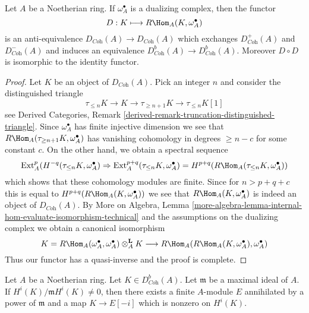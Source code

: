 \begin{lemma}
\label{lemma-dualizing}
Let $A$ be a Noetherian ring. If $\omega_A^\bullet$ is a dualizing
complex, then the functor
$$
D : K \longmapsto R\Hom_A(K, \omega_A^\bullet)
$$
is an anti-equivalence $D_{\textit{Coh}}(A) \to D_{\textit{Coh}}(A)$
which exchanges $D^+_{\textit{Coh}}(A)$ and $D^-_{\textit{Coh}}(A)$
and induces an equivalence $D^b_{\textit{Coh}}(A) \to D^b_{\textit{Coh}}(A)$.
Moreover $D \circ D$ is isomorphic to the identity functor.
\end{lemma}

\begin{proof}
Let $K$ be an object of $D_{\textit{Coh}}(A)$. Pick an integer $n$ and
consider the distinguished triangle
$$
\tau_{\leq n}K \to K \to \tau_{\geq n + 1}K \to \tau_{\leq n}K[1]
$$
see Derived Categories, Remark
\ref{derived-remark-truncation-distinguished-triangle}.
Since $\omega_A^\bullet$ has finite injective dimension we see
that $R\Hom_A(\tau_{\geq n + 1}K, \omega_A^\bullet)$ has vanishing
cohomology in degrees $\geq n - c$ for some constant $c$.
On the other hand, we obtain a spectral sequence
$$
\text{Ext}_A^p(H^{-q}(\tau_{\leq n}K, \omega_A^\bullet)
\Rightarrow
\text{Ext}_A^{p + q}(\tau_{\leq n}K, \omega_A^\bullet) =
H^{p + q}(R\Hom_A(\tau_{\leq n}K, \omega_A^\bullet))
$$
which shows that these cohomology modules are finite. Since for
$n > p + q + c$ this is equal to $H^{p + q}(R\Hom_A(K, \omega_A^\bullet))$
we see that $R\Hom_A(K, \omega_A^\bullet)$ is indeed an object
of $D_{\textit{Coh}}(A)$.
By More on Algebra, Lemma
\ref{more-algebra-lemma-internal-hom-evaluate-isomorphism-technical}
and the assumptions on the dualizing complex
we obtain a canonical isomorphism
$$
K = R\Hom_A(\omega_A^\bullet, \omega_A^\bullet) \otimes_A^\mathbf{L} K
\longrightarrow
R\Hom_A(R\Hom_A(K, \omega_A^\bullet), \omega_A^\bullet)
$$
Thus our functor has a quasi-inverse and the proof is complete.
\end{proof}

\begin{lemma}
\label{lemma-detect-cohomology}
Let $A$ be a Noetherian ring. Let $K \in D^b_{\textit{Coh}}(A)$.
Let $\mathfrak m$ be a maximal ideal of $A$.
If $H^i(K)/\mathfrak m H^i(K) \not = 0$, then there exists a finite
$A$-module $E$ annihilated by a power of $\mathfrak m$
and a map $K \to E[-i]$ which is nonzero on $H^i(K)$.
\end{lemma}

